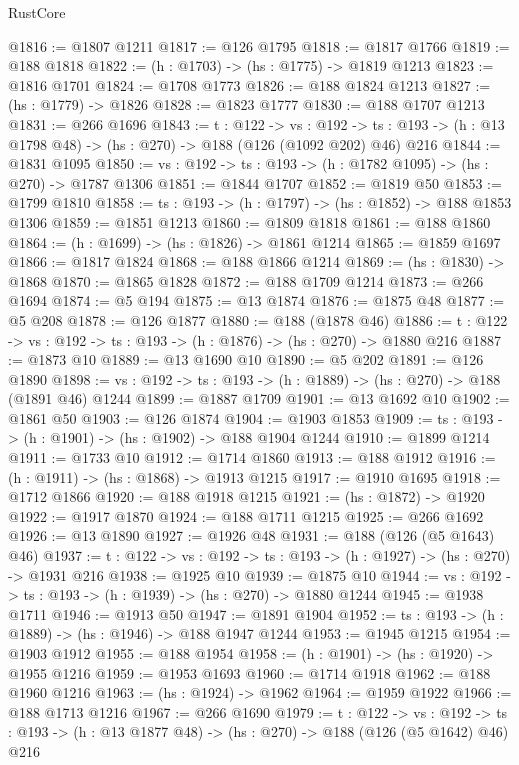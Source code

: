 \begin{lexlean}{RustCore}
\begin{coremodule}
@1816 := @1807 @1211
@1817 := @126 @1795
@1818 := @1817 @1766
@1819 := @188 @1818
@1822 := (h : @1703) -> (hs : @1775) -> @1819 @1213
@1823 := @1816 @1701
@1824 := @1708 @1773
@1826 := @188 @1824 @1213
@1827 := (hs : @1779) -> @1826
@1828 := @1823 @1777
@1830 := @188 @1707 @1213
@1831 := @266 @1696
@1843 := {t : @122} ->
  {vs : @192} ->
  {ts : @193} -> (h : @13 @1798 @48) -> (hs : @270) -> @188 (@126 (@1092 @202) @46) @216
@1844 := @1831 @1095
@1850 := {vs : @192} -> {ts : @193} -> (h : @1782 @1095) -> (hs : @270) -> @1787 @1306
@1851 := @1844 @1707
@1852 := @1819 @50
@1853 := @1799 @1810
@1858 := {ts : @193} -> (h : @1797) -> (hs : @1852) -> @188 @1853 @1306
@1859 := @1851 @1213
@1860 := @1809 @1818
@1861 := @188 @1860
@1864 := (h : @1699) -> (hs : @1826) -> @1861 @1214
@1865 := @1859 @1697
@1866 := @1817 @1824
@1868 := @188 @1866 @1214
@1869 := (hs : @1830) -> @1868
@1870 := @1865 @1828
@1872 := @188 @1709 @1214
@1873 := @266 @1694
@1874 := @5 @194
@1875 := @13 @1874
@1876 := @1875 @48
@1877 := @5 @208
@1878 := @126 @1877
@1880 := @188 (@1878 @46)
@1886 := {t : @122} -> {vs : @192} -> {ts : @193} -> (h : @1876) -> (hs : @270) -> @1880 @216
@1887 := @1873 @10
@1889 := @13 @1690 @10
@1890 := @5 @202
@1891 := @126 @1890
@1898 := {vs : @192} -> {ts : @193} -> (h : @1889) -> (hs : @270) -> @188 (@1891 @46) @1244
@1899 := @1887 @1709
@1901 := @13 @1692 @10
@1902 := @1861 @50
@1903 := @126 @1874
@1904 := @1903 @1853
@1909 := {ts : @193} -> (h : @1901) -> (hs : @1902) -> @188 @1904 @1244
@1910 := @1899 @1214
@1911 := @1733 @10
@1912 := @1714 @1860
@1913 := @188 @1912
@1916 := (h : @1911) -> (hs : @1868) -> @1913 @1215
@1917 := @1910 @1695
@1918 := @1712 @1866
@1920 := @188 @1918 @1215
@1921 := (hs : @1872) -> @1920
@1922 := @1917 @1870
@1924 := @188 @1711 @1215
@1925 := @266 @1692
@1926 := @13 @1890
@1927 := @1926 @48
@1931 := @188 (@126 (@5 @1643) @46)
@1937 := {t : @122} -> {vs : @192} -> {ts : @193} -> (h : @1927) -> (hs : @270) -> @1931 @216
@1938 := @1925 @10
@1939 := @1875 @10
@1944 := {vs : @192} -> {ts : @193} -> (h : @1939) -> (hs : @270) -> @1880 @1244
@1945 := @1938 @1711
@1946 := @1913 @50
@1947 := @1891 @1904
@1952 := {ts : @193} -> (h : @1889) -> (hs : @1946) -> @188 @1947 @1244
@1953 := @1945 @1215
@1954 := @1903 @1912
@1955 := @188 @1954
@1958 := (h : @1901) -> (hs : @1920) -> @1955 @1216
@1959 := @1953 @1693
@1960 := @1714 @1918
@1962 := @188 @1960 @1216
@1963 := (hs : @1924) -> @1962
@1964 := @1959 @1922
@1966 := @188 @1713 @1216
@1967 := @266 @1690
@1979 := {t : @122} ->
  {vs : @192} ->
  {ts : @193} -> (h : @13 @1877 @48) -> (hs : @270) -> @188 (@126 (@5 @1642) @46) @216

\end{coremodule}
\end{lexlean}
